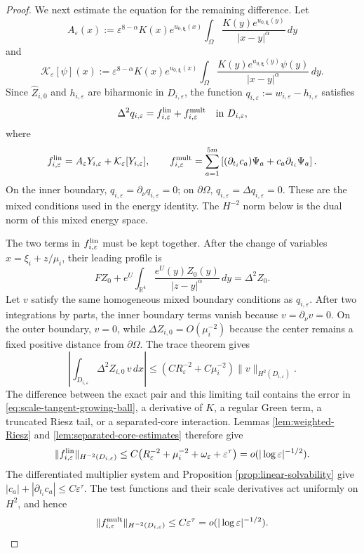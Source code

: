 \documentclass[11pt]{article}
\numberwithin{equation}{section}
\begin{document}
\begin{proof}
We next estimate the equation for the remaining difference. Let
\[
A_\varepsilon(x)
:=\varepsilon^{8-\alpha}K(x)e^{u_{0,\boldsymbol\xi}(x)}
\int_\Omega
\frac{K(y)e^{u_{0,\boldsymbol\xi}(y)}}{|x-y|^\alpha}\,dy
\]
and
\[
\mathcal K_\varepsilon[\psi](x)
:=\varepsilon^{8-\alpha}K(x)e^{u_{0,\boldsymbol\xi}(x)}
\int_\Omega
\frac{K(y)e^{u_{0,\boldsymbol\xi}(y)}\psi(y)}
{|x-y|^\alpha}\,dy.
\]
Since $\widehat Z_{i,0}$ and $h_{i,\varepsilon}$ are biharmonic in
$D_{i,\varepsilon}$, the function
$q_{i,\varepsilon}:=w_{i,\varepsilon}-h_{i,\varepsilon}$ satisfies
\begin{equation}\label{eq:scale-tangent-difference-equation}
\Delta^2q_{i,\varepsilon}
=f_{i,\varepsilon}^{\rm lin}
+f_{i,\varepsilon}^{\rm mult}
\quad\text{in }D_{i,\varepsilon},
\end{equation}
where
\[
f_{i,\varepsilon}^{\rm lin}
=A_\varepsilon Y_{i,\varepsilon}
+\mathcal K_\varepsilon[Y_{i,\varepsilon}],
\qquad
f_{i,\varepsilon}^{\rm mult}
=\sum_{a=1}^{5m}
\left[(\partial_{t_i}c_a)\Psi_a
+c_a\partial_{t_i}\Psi_a\right].
\]
On the inner boundary,
$q_{i,\varepsilon}=\partial_\nu q_{i,\varepsilon}=0$; on
$\partial\Omega$,
$q_{i,\varepsilon}=\Delta q_{i,\varepsilon}=0$. These are the mixed
conditions used in the energy identity. The $H^{-2}$ norm below is
the dual norm of this mixed energy space.

The two terms in $f_{i,\varepsilon}^{\rm lin}$ must be kept together.
After the change of variables $x=\xi_i+z/\mu_i$, their leading
profile is
\[
FZ_0+e^U\int_{\mathbb R^4}
\frac{e^U(y)Z_0(y)}{|z-y|^\alpha}\,dy
=\Delta^2Z_0.
\]
Let $v$ satisfy the same homogeneous mixed boundary conditions as
$q_{i,\varepsilon}$. After two integrations by parts, the inner
boundary terms vanish because $v=\partial_\nu v=0$. On the outer
boundary, $v=0$, while
$\Delta Z_{i,0}=O(\mu_i^{-2})$ because the center remains a fixed
positive distance from $\partial\Omega$. The trace theorem gives
\[
\left|\int_{D_{i,\varepsilon}}\Delta^2Z_{i,0}\,v\,dx\right|
\leq
\left(CR_\varepsilon^{-2}+C\mu_i^{-2}\right)
\|v\|_{H^2(D_{i,\varepsilon})}.
\]
The difference between the exact pair and this limiting tail contains
the error in \eqref{eq:scale-tangent-growing-ball}, a derivative of
$K$, a regular Green term, a truncated Riesz tail, or a separated-core
interaction. Lemmas \ref{lem:weighted-Riesz} and
\ref{lem:separated-core-estimates} therefore give
\begin{equation*}
\|f_{i,\varepsilon}^{\rm lin}\|_{H^{-2}(D_{i,\varepsilon})}
\leq C\bigl(R_\varepsilon^{-2}+\mu_i^{-2}+\omega_\varepsilon
+\varepsilon^\tau\bigr)
=o(|\log\varepsilon|^{-1/2}).
\end{equation*}
The differentiated multiplier system and Proposition
\ref{prop:linear-solvability} give
$|c_a|+|\partial_{t_i}c_a|\leq C\varepsilon^\tau$. The test functions
and their scale derivatives act uniformly on $H^2$, and hence
\begin{equation}\label{eq:scale-difference-multiplier-estimate}
\|f_{i,\varepsilon}^{\rm mult}\|_{H^{-2}(D_{i,\varepsilon})}
\leq C\varepsilon^\tau
=o(|\log\varepsilon|^{-1/2}).
\end{equation}


\end{proof}
\end{document}
